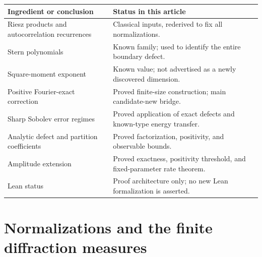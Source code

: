 \documentclass[11pt,a4paper]{article}
\numberwithin{equation}{section}
\theoremstyle{definition}
\theoremstyle{remark}
\begin{document}
\begin{center}
\begin{tabularx}{\textwidth}{@{}p{}X@{}}
\toprule
Ingredient or conclusion & Status in this article \\
\midrule
Riesz products and autocorrelation recurrences & Classical inputs, rederived to fix all normalizations. \\
Stern polynomials & Known family; used to identify the entire boundary defect. \\
Square-moment exponent & Known value; not advertised as a newly discovered dimension. \\
Positive Fourier-exact correction & Proved finite-size construction; main candidate-new bridge. \\
Sharp Sobolev error regimes & Proved application of exact defects and known-type energy transfer. \\
Analytic defect and partition coefficients & Proved factorization, positivity, and observable bounds. \\
Amplitude extension & Proved exactness, positivity threshold, and fixed-parameter rate theorem. \\
Lean status & Proof architecture only; no new Lean formalization is asserted. \\
\bottomrule
\end{tabularx}
\end{center}

\section{Normalizations and the finite diffraction measures}
\label{sec:setup}
\end{document}
